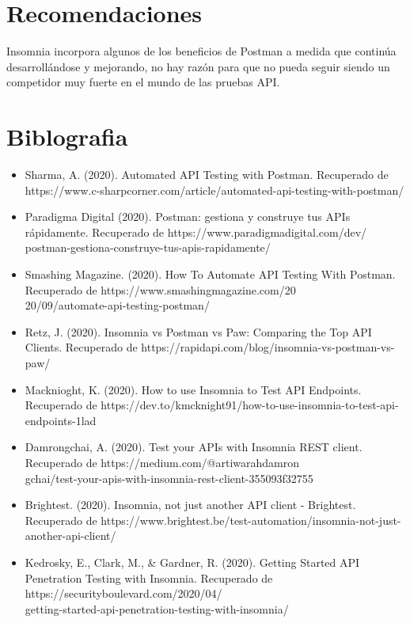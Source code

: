 \documentclass[twoside,twocolumn]{article}
\begin{document}
\section{Recomendaciones}
Insomnia incorpora algunos de los beneficios de Postman a medida que continúa desarrollándose y mejorando, no hay razón para que no pueda seguir siendo un competidor muy fuerte en el mundo de las pruebas API.

\section{Biblografia}

\begin{itemize}
    \item Sharma, A. (2020). Automated API Testing with Postman. 
    Recuperado de https://www.c-sharpcorner.com/article/automated-api-testing-with-postman/    
    \item Paradigma Digital (2020). Postman: gestiona y construye tus APIs rápidamente.
    Recuperado de  https://www.paradigmadigital.com/dev/\\postman-gestiona-construye-tus-apis-rapidamente/    
    \item Smashing Magazine. (2020). How To Automate API Testing With Postman.
    Recuperado de https://www.smashingmagazine.com/20\\20/09/automate-api-testing-postman/    
    \item Retz, J. (2020). Insomnia vs Postman vs Paw: Comparing the Top API Clients.
    Recuperado de https://rapidapi.com/blog/insomnia-vs-postman-vs-paw/    
    \item Macknioght, K. (2020). How to use Insomnia to Test API Endpoints.
    Recuperado de  https://dev.to/kmcknight91/how-to-use-insomnia-to-test-api-endpoints-1lad    
    \item Damrongchai, A. (2020). Test your APIs with Insomnia REST client.
    Recuperado de  https://medium.com/@artiwarahdamron\\gchai/test-your-apis-with-insomnia-rest-client-355093f32755    
    \item Brightest. (2020). Insomnia, not just another API client - Brightest.
    Recuperado de https://www.brightest.be/test-automation/insomnia-not-just-another-api-client/    
     \item Kedrosky, E., Clark, M., \& Gardner, R. (2020). Getting Started API Penetration Testing with Insomnia.
     Recuperado de https://securityboulevard.com/2020/04/\\getting-started-api-penetration-testing-with-insomnia/
     
\end{itemize}

\end{document}
